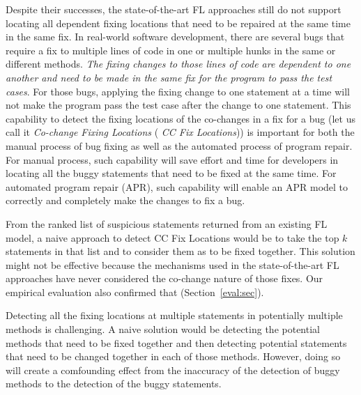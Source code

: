 Despite their successes, the state-of-the-art FL approaches still do
not support locating all dependent fixing locations that need to be repaired
at the same time in the same fix. In real-world software development,
there are several bugs that require a fix to multiple lines of code in
one or multiple hunks in the same or different methods. {\em The
  fixing changes to those lines of code are dependent to one another
  and need to be made in the same fix for the program to pass the test
  cases}. For those bugs, applying the fixing change to one statement
at a time will not make the program pass the test case after the
change to one statement.
%
This capability to detect the fixing locations of the co-changes in a
fix for a bug (let us call it {\em Co-change Fixing Locations} ({\em
  CC Fix Locations})) is important for both the manual process of bug
fixing as well as the automated process of program repair. For
manual process, such capability will save effort and time for
developers in locating all the buggy statements that need to be fixed
at the same time. For automated program repair (APR), such capability
will enable an APR model to correctly and completely make the changes
to fix a bug.

From the ranked list of suspicious statements returned from an
existing FL model, a naive approach to detect CC Fix Locations would
be to take the top $k$ statements in that list and to consider them as
to be fixed together. This solution might not be effective
because the mechanisms used in the state-of-the-art FL approaches have
never considered the co-change nature of those fixes. Our empirical
evaluation also confirmed that (Section~\ref{eval:sec}).

Detecting all the fixing locations at multiple statements in
potentially multiple methods is challenging. A naive solution would be
detecting the potential methods that need to be fixed together and
then detecting potential statements that need to be changed together
in each of those methods. However, doing so will create a comfounding
effect from the inaccuracy of the detection of buggy methods to the
detection of the buggy statements.

